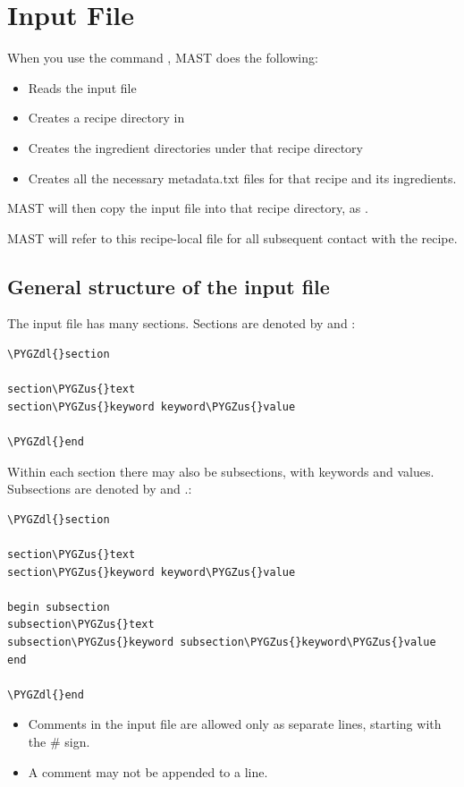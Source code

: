 \documentclass[letterpaper,10pt,english]{sphinxmanual}
\def\PYGZus{\char`\_}
\def\PYGZdl{\char`\$}
\begin{document}
\chapter{Input File}
\label{3_0_inputfile::doc}\label{3_0_inputfile:input-file}
When you use the command , MAST does the following:
\begin{itemize}
\item {} 
Reads the input file

\item {} 
Creates a recipe directory in 

\item {} 
Creates the ingredient directories under that recipe directory

\item {} 
Creates all the necessary metadata.txt files for that recipe and its ingredients.

\end{itemize}

MAST will then copy the input file into that recipe directory, as .

MAST will refer to this recipe-local  file for all subsequent contact with the recipe.


\section{General structure of the input file}
\label{3_0_inputfile:general-structure-of-the-input-file}
The input file has many sections. Sections are denoted by  and :

\begin{Verbatim}[commandchars=\\\{\}]
\PYGZdl{}section

section\PYGZus{}text
section\PYGZus{}keyword keyword\PYGZus{}value

\PYGZdl{}end
\end{Verbatim}

Within each section there may also be subsections, with keywords and values.
Subsections are denoted by  and .:

\begin{Verbatim}[commandchars=\\\{\}]
\PYGZdl{}section

section\PYGZus{}text
section\PYGZus{}keyword keyword\PYGZus{}value

begin subsection
subsection\PYGZus{}text
subsection\PYGZus{}keyword subsection\PYGZus{}keyword\PYGZus{}value
end

\PYGZdl{}end
\end{Verbatim}
\begin{itemize}
\item {} 
Comments in the input file are allowed only as separate lines, starting with the \# sign.

\item {} 
A comment may not be appended to a line.

\end{itemize}
\end{document}
